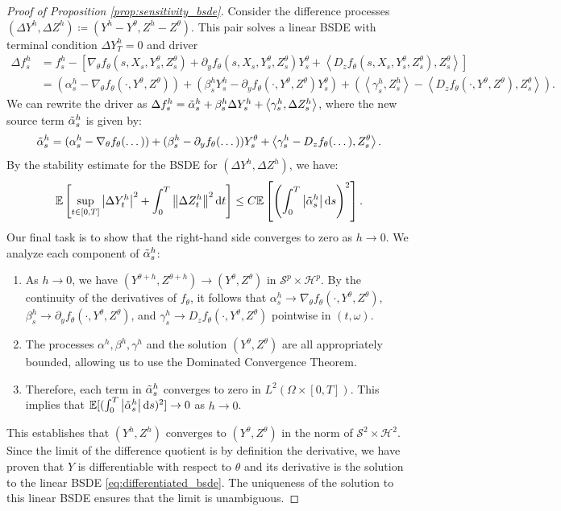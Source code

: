 \documentclass[qian]{imsart}
\newcommand{\E}{\mathbb{E}}
\newcommand{\dd}{\mathrm{d}}
\newcommand{\norm}[1]{\left\lVert#1\right\rVert}
\newcommand{\abs}[1]{\left\lvert#1\right\rvert}
\newcommand{\scpr}[2]{\left\langle #1, #2 \right\rangle}
\theoremstyle{plain}
\theoremstyle{definition}
\begin{document}
\begin{proof}[Proof of Proposition \ref{prop:sensitivity_bsde}]
Consider the difference processes $(\Delta Y^h, \Delta Z^h) \coloneqq (Y^h - Y^\theta, Z^h - Z^\theta)$. This pair solves a linear BSDE with terminal condition $\Delta Y^h_T = 0$ and driver
\begin{align*}
\Delta f^h_s &= f^h_s - \left[ \nabla_\theta f_\theta(s, X_s, Y^\theta_s, Z^\theta_s) + \partial_y f_\theta(s, X_s, Y^\theta_s, Z^\theta_s) Y^\theta_s + \scpr{D_z f_\theta(s, X_s, Y^\theta_s, Z^\theta_s)}{Z^\theta_s} \right] \\
&= (\alpha^h_s - \nabla_\theta f_\theta(\cdot, Y^\theta, Z^\theta)) + (\beta^h_s Y^h_s - \partial_y f_\theta(\cdot, Y^\theta, Z^\theta) Y^\theta_s) + (\scpr{\gamma^h_s}{Z^h_s} - \scpr{D_z f_\theta(\cdot, Y^\theta, Z^\theta)}{Z^\theta_s}).
\end{align*}
We can rewrite the driver as $\Delta f^h_s = \Tilde{\alpha}^h_s + \beta^h_s \Delta Y^h_s + \scpr{\gamma^h_s}{\Delta Z^h_s}$, where the new source term $\Tilde{\alpha}^h_s$ is given by:
\[ \Tilde{\alpha}^h_s = (\alpha^h_s - \nabla_\theta f_\theta(\dots)) + (\beta^h_s - \partial_y f_\theta(\dots))Y^\theta_s + \scpr{\gamma^h_s - D_z f_\theta(\dots)}{Z^\theta_s}. \]
By the stability estimate for the BSDE for $(\Delta Y^h, \Delta Z^h)$, we have:
\[ \E\left[\sup_{t \in [0,T]} \abs{\Delta Y^h_t}^2 + \int_0^T \norm{\Delta Z^h_t}^2 \dd t \right] \le C \E\left[\left(\int_0^T \abs{\Tilde{\alpha}^h_s} \dd s\right)^2 \right]. \]
Our final task is to show that the right-hand side converges to zero as $h \to 0$. We analyze each component of $\Tilde{\alpha}^h_s$:
\begin{enumerate}
    \item As $h \to 0$, we have $(Y^{\theta+h}, Z^{\theta+h}) \to (Y^\theta, Z^\theta)$ in $\mathcal{S}^p \times \mathcal{H}^p$. By the continuity of the derivatives of $f_\theta$, it follows that $\alpha^h_s \to \nabla_\theta f_\theta(\cdot, Y^\theta, Z^\theta)$, $\beta^h_s \to \partial_y f_\theta(\cdot, Y^\theta, Z^\theta)$, and $\gamma^h_s \to D_z f_\theta(\cdot, Y^\theta, Z^\theta)$ pointwise in $(t, \omega)$.
    \item The processes $\alpha^h, \beta^h, \gamma^h$ and the solution $(Y^\theta, Z^\theta)$ are all appropriately bounded, allowing us to use the Dominated Convergence Theorem.
    \item Therefore, each term in $\Tilde{\alpha}^h_s$ converges to zero in $L^2(\Omega \times [0,T])$. This implies that $\E[(\int_0^T \abs{\Tilde{\alpha}^h_s} \dd s)^2] \to 0$ as $h \to 0$.
\end{enumerate}
This establishes that $(Y^h, Z^h)$ converges to $(Y^\theta, Z^\theta)$ in the norm of $\mathcal{S}^2 \times \mathcal{H}^2$. Since the limit of the difference quotient is by definition the derivative, we have proven that $Y$ is differentiable with respect to $\theta$ and its derivative is the solution to the linear BSDE \eqref{eq:differentiated_bsde}. The uniqueness of the solution to this linear BSDE ensures that the limit is unambiguous.
\end{proof}
\end{document}
